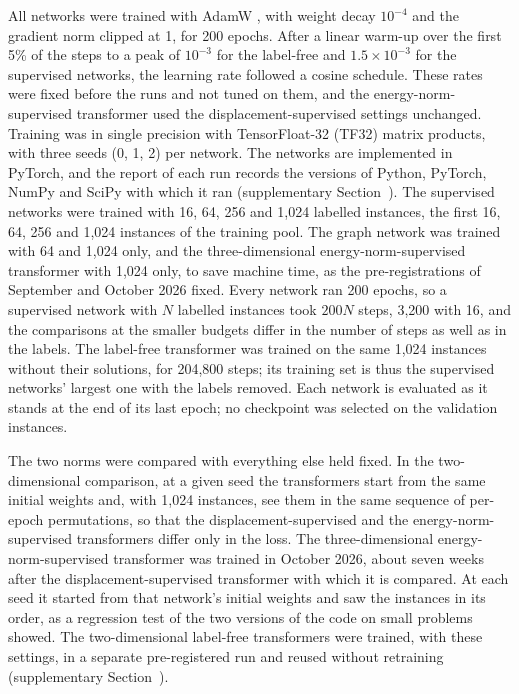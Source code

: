 All networks were trained with AdamW \cite{Loshchilov2019}, with weight decay $10^{-4}$ and
the gradient norm clipped at 1, for 200 epochs. After a linear warm-up over the first 5\% of the steps to a peak of $10^{-3}$ for the
label-free and $1.5\times10^{-3}$ for the supervised networks, the learning rate followed a
cosine schedule. These rates were fixed before
the runs and not tuned on them, and the energy-norm-supervised transformer used the
displacement-supervised settings unchanged. Training was in single precision with
TensorFloat-32 (TF32) matrix products, with three seeds (0, 1, 2) per network. The networks
are implemented in PyTorch, and the report of each run records the versions of Python,
PyTorch, NumPy and SciPy with which it ran (supplementary Section~\SuppRepro{}). The
supervised networks were trained with 16, 64, 256 and 1,024 labelled instances, the first 16, 64, 256 and 1,024 instances of the training pool. The graph network was trained
with 64 and 1,024 only, and the three-dimensional energy-norm-supervised transformer with
1,024 only, to save machine time, as the pre-registrations of September and October 2026
fixed.
Every network ran 200 epochs, so a supervised network with $N$ labelled instances took
$200N$ steps, 3,200 with 16, and the comparisons at the smaller budgets differ in the number
of steps as well as in the labels. The label-free transformer was trained on the same 1,024
instances without their solutions, for 204,800 steps; its training set is thus the
supervised networks' largest one with the labels removed. Each network is evaluated as it
stands at the end of its last epoch; no checkpoint was selected on the validation instances.

The two norms were compared with everything else held fixed. In the two-dimensional
comparison, at a given seed the transformers start from the same initial weights and, with
1,024 instances, see them in the same sequence of per-epoch permutations, so that the
displacement-supervised and the energy-norm-supervised transformers differ only in the loss.
The three-dimensional energy-norm-supervised transformer was trained in October 2026, about
seven weeks after the displacement-supervised transformer with which it is compared. At each seed it started from that network's initial weights and saw
the instances in its order, as a regression test of the two versions of the code on small
problems showed. The two-dimensional
label-free transformers were trained, with these settings, in a separate pre-registered run
and reused without retraining (supplementary Section~\SuppSide).

